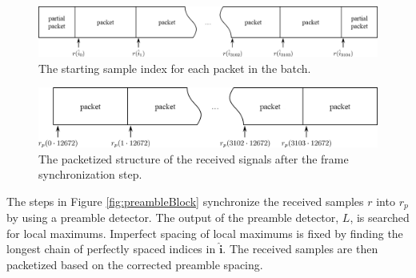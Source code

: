 \begin{figure}
	\centering\includegraphics[width=\textwidth/10*8]{figures/gpu/packets_in_batch.png}
	\caption{The starting sample index for each packet in the batch.}
	\label{fig:packets_in_batch}
\end{figure}
\begin{figure}
	\centering\includegraphics[width=\textwidth/10*8]{figures/gpu/packetized.png}
	\caption{The packetized structure of the received signals after the frame synchronization step.}
	\label{fig:packetized}
\end{figure}

The steps in Figure \ref{fig:preambleBlock} synchronize the received samples $r$ into $r_p$ by using a preamble detector.
The output of the preamble detector, $L$, is searched for local maximums.
Imperfect spacing of local maximums is fixed by finding the longest chain of perfectly spaced indices in $\hat{\mathbf{i}}$.
The received samples are then packetized based on the corrected preamble spacing.

\clearpage


